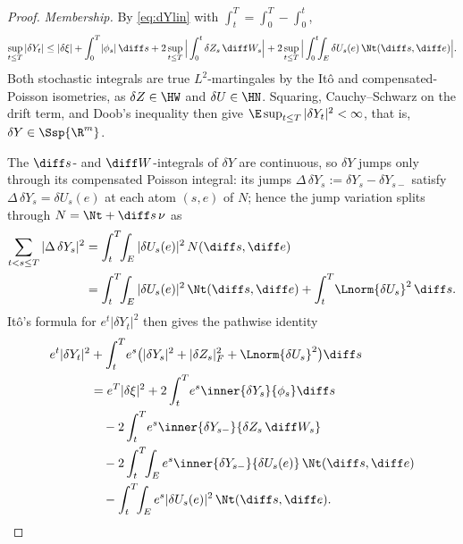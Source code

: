 \begin{proof}
\emph{Membership.} By \eqref{eq:dYlin} with $\int_t^T=\int_0^T-\int_0^t$,
\[
\sup_{t\le T}|\delta Y_t|\le|\delta\xi|+\int_0^T\!|\phi_s|\,\diff s
+2\sup_{t\le T}\Big|\int_0^t\delta Z_s\,\diff W_s\Big|
+2\sup_{t\le T}\Big|\int_0^t\!\!\int_E\delta U_s(e)\,\Nt(\diff s,\diff e)\Big|.
\]
Both stochastic integrals are true $L^2$-martingales by the It\^o and
compensated-Poisson isometries, as $\delta Z\in\HW$ and $\delta U\in\HN$.
Squaring, Cauchy--Schwarz on the drift term, and Doob's inequality then give
$\E\sup_{t\le T}|\delta Y_t|^2<\infty$, that is, $\delta Y\in\Ssp{\R^m}$.

The $\diff s$- and $\diff W$-integrals of $\delta Y$ are continuous, so
$\delta Y$ jumps only through its compensated Poisson integral: its jumps
$\Delta\,\delta Y_s:=\delta Y_s-\delta Y_{s-}$ satisfy $\Delta\,\delta Y_s=\delta U_s(e)$
at each atom $(s,e)$ of $N$; hence the jump variation
splits through $N=\Nt+\diff s\,\nu$ as
\begin{align*}
\sum_{t<s\le T}|\Delta\,\delta Y_s|^2
&=\int_t^T\!\!\int_E|\delta U_s(e)|^2\,N(\diff s,\diff e)\\
&=\int_t^T\!\!\int_E|\delta U_s(e)|^2\,\Nt(\diff s,\diff e)
+\int_t^T\!\Lnorm{\delta U_s}^2\,\diff s.
\end{align*}
It\^o's formula for
$e^{t}|\delta Y_t|^2$ then gives the pathwise identity
\begin{equation}\label{eq:itoY2}
\begin{aligned}
e^{t}|\delta Y_t|^2
&+\int_t^T\!e^{s}\big(|\delta Y_s|^2+|\delta Z_s|_F^2+\Lnorm{\delta U_s}^2\big)\diff s\\
&=e^{T}|\delta\xi|^2+2\int_t^T\!e^{s}\inner{\delta Y_s}{\phi_s}\diff s\\
&\quad-2\int_t^T\!e^{s}\inner{\delta Y_{s-}}{\delta Z_s\,\diff W_s}\\
&\quad-2\int_t^T\!\!\int_E e^{s}\inner{\delta Y_{s-}}{\delta U_s(e)}\,\Nt(\diff s,\diff e)\\
&\quad-\int_t^T\!\!\int_E e^{s}|\delta U_s(e)|^2\,\Nt(\diff s,\diff e).
\end{aligned}
\end{equation}


\end{proof}
